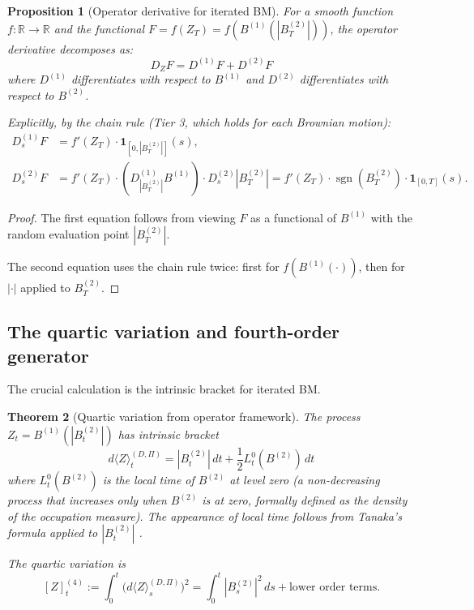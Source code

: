 \documentclass[12pt]{article}
\theoremstyle{plain}
\newtheorem{theorem}{Theorem}[section]
\newtheorem{proposition}[theorem]{Proposition}
\theoremstyle{definition}
\theoremstyle{remark}
\newcommand{\R}{\mathbb{R}}
\newcommand{\sgn}{\operatorname{sgn}}
\begin{document}
\begin{proposition}[Operator derivative for iterated BM]\label{prop:iterated-BM-derivative}
For a smooth function $f: \R \to \R$ and the functional $F = f(Z_T) = f(B^{(1)}(|B_T^{(2)}|))$, the operator derivative decomposes as:
\begin{equation}\label{eq:iterated-BM-derivative-decomp}
D_Z F = D^{(1)} F + D^{(2)} F
\end{equation}
where $D^{(1)}$ differentiates with respect to $B^{(1)}$ and $D^{(2)}$ differentiates with respect to $B^{(2)}$.

Explicitly, by the chain rule (Tier 3, which holds for each Brownian motion):
\begin{align}
D_s^{(1)} F &= f'(Z_T) \cdot \mathbf{1}_{[0, |B_T^{(2)}|]}(s), \label{eq:iterated-D1} \\
D_s^{(2)} F &= f'(Z_T) \cdot (D_{|B_T^{(2)}|}^{(1)} B^{(1)}) \cdot D_s^{(2)} |B_T^{(2)}| = f'(Z_T) \cdot \sgn(B_T^{(2)}) \cdot \mathbf{1}_{[0,T]}(s). \label{eq:iterated-D2}
\end{align}
\end{proposition}

\begin{proof}
The first equation follows from viewing $F$ as a functional of $B^{(1)}$ with the random evaluation point $|B_T^{(2)}|$.

The second equation uses the chain rule twice: first for $f(B^{(1)}(\cdot))$, then for $|\cdot|$ applied to $B_T^{(2)}$.
\end{proof}

\subsection{The quartic variation and fourth-order generator}

The crucial calculation is the intrinsic bracket for iterated BM.

\begin{theorem}[Quartic variation from operator framework]\label{thm:quartic-variation}
The process $Z_t = B^{(1)}(|B_t^{(2)}|)$ has intrinsic bracket
\begin{equation}\label{eq:iterated-bracket}
d\langle Z \rangle_t^{(D,\Pi)} = |B_t^{(2)}| \, dt + \frac{1}{2}L_t^0(B^{(2)}) \, dt
\end{equation}
where $L_t^0(B^{(2)})$ is the local time of $B^{(2)}$ at level zero (a non-decreasing process that increases only when $B^{(2)}$ is at zero, formally defined as the density of the occupation measure). The appearance of local time follows from Tanaka's formula applied to $|B_t^{(2)}|$ \cite{RevuzYor1999}.

The quartic variation is
\begin{equation}\label{eq:quartic-var}
[Z]_t^{(4)} := \int_0^t \bigl(d\langle Z \rangle_s^{(D,\Pi)}\bigr)^2 = \int_0^t |B_s^{(2)}|^2 \, ds + \text{lower order terms}.
\end{equation}
\end{theorem}
\end{document}
